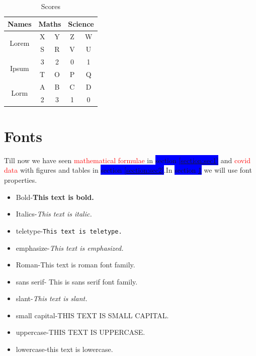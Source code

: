 \documentclass[10pt]{article}
\begin{document}
\newpage
\pagecolor{green}

\begin{center}
\begin{table}[t]
\centering
\begin{tabular}{|c|c|c|c|c|}
\hline
Names & \multicolumn{2}{|c|}{Maths} & \multicolumn{2}{|c|}{Science}  \\
\hline
\multirow{2}{4em}{Lorem} & X & Y & Z & W \\
\cline{2-5}
& S & R & V & U \\
\hline
\multirow{2}{4em}{Ipsum} & 3 & 2 & 0 & 1 \\
\cline{2-5}
& T & O & P & Q \\
\hline
\multirow{2}{4em}{Lorm} & A & B & C & D \\
\cline{2-5}
& 2 & 3 & 1 & 0 \\
\hline

\end{tabular}
\caption{Scores}
\label{tab:table2}
\end{table}
\end{center}

\section{Fonts}
\label{section:sec3}
Till now we have seen \textcolor{red}{ mathematical formulae} in \colorbox{blue}{section \ref{section:sec1}} and \textcolor{red}{covid data} with figures and tables in \colorbox{blue}{section \ref{section:sec2}}.In  \colorbox{blue}{section \ref{section:sec3}} we will use font properties.



\begin{itemize}

\item Bold-\textbf{This text is bold.}

\item Italics-\textit{This text is italic.}

\item teletype-\texttt{This text is teletype.}

\item emphasize-\emph{This text is emphasized.}

\item Roman-\textrm{This text is roman font family.}

\item sans serif- \textsf{This is sans serif font family.}

\item slant-\textsl{This text is slant.}

\item small capital-\textsc{THIS TEXT IS SMALL CAPITAL.}

\item uppercase-\uppercase{THIS TEXT IS UPPERCASE.}

\item lowercase-this text is lowercase.

\end{itemize}
\end{document}
